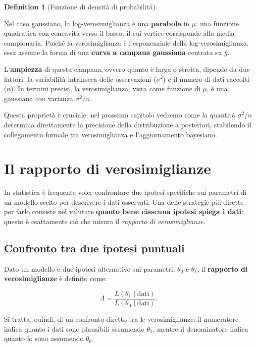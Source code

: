 \documentclass[
  letterpaper,
  DIV=11,
  numbers=noendperiod,
  oneside]{scrreprt}
\theoremstyle{definition}
\theoremstyle{plain}
\theoremstyle{definition}
\newtheorem{definition}{Definition}[chapter]
\theoremstyle{remark}
\begin{document}
\begin{definition}[Funzione di densità di
probabilità]
\begin{tcolorbox}
Nel caso gaussiano, la log-verosimiglianza è una \textbf{parabola} in
\(\mu\): una funzione quadratica con concavità verso il basso, il cui
vertice corrisponde alla media campionaria. Poiché la verosimiglianza è
l'esponenziale della log-verosimiglianza, essa assume la forma di una
\textbf{curva a campana gaussiana} centrata su \(\bar{y}\).

L'\textbf{ampiezza} di questa campana, ovvero quanto è larga o stretta,
dipende da due fattori: la variabilità intrinseca delle osservazioni
(\(\sigma^2\)) e il numero di dati raccolti (\(n\)). In termini precisi,
la verosimiglianza, vista come funzione di \(\mu\), è una gaussiana con
varianza \(\sigma^2/n\).

Questa proprietà è cruciale: nel prossimo capitolo vedremo come la
quantità \(\sigma^2/n\) determina direttamente la precisione della
distribuzione a posteriori, stabilendo il collegamento formale tra
verosimiglianza e l'aggiornamento bayesiano.

\end{tcolorbox}

\section{Il rapporto di
verosimiglianze}\label{il-rapporto-di-verosimiglianze}

In statistica è frequente voler confrontare due ipotesi specifiche sui
parametri di un modello scelto per descrivere i dati osservati. Una
delle strategie più dirette per farlo consiste nel valutare
\textbf{quanto bene ciascuna ipotesi spiega i dati}: questo è
esattamente ciò che misura il \emph{rapporto di verosimiglianze}.

\subsection{Confronto tra due ipotesi
puntuali}\label{confronto-tra-due-ipotesi-puntuali}

Dato un modello e due ipotesi alternative sui parametri, \(\theta_0\) e
\(\theta_1\), il \textbf{rapporto di verosimiglianze} è definito come:

\[
\Lambda = \frac{L(\theta_1 \mid \text{dati})}{L(\theta_0 \mid \text{dati})}.
\]

Si tratta, quindi, di un confronto diretto tra le verosimiglianze: il
numeratore indica quanto i dati sono plausibili assumendo \(\theta_1\),
mentre il denominatore indica quanto lo sono assumendo \(\theta_0\).


\end{definition}
\end{document}

